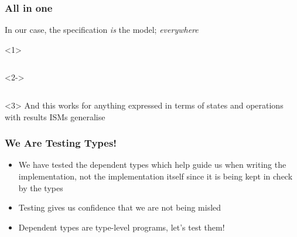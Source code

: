 \documentclass[compress]{beamer}
\begin{document}
\begin{frame}[fragile]
  \frametitle{All in one}

  \large

  
  In our case, the specification \textit{is} the model; \textit{everywhere}

  \begin{onlyenv}<1>
  \inputminted{Idris}{qc-things/ATM-arb-trace.idr}
  \end{onlyenv}

  \begin{onlyenv}<2->
  \inputminted[highlightlines=4-5,highlightcolor=highl]{Idris}{qc-things/ATM-arb-trace.idr}
  \end{onlyenv}

  \begin{onlyenv}<3>
  And this works for anything expressed in terms of states and operations with
  results {\textemdash} ISMs generalise
  \end{onlyenv}

\end{frame}


\begin{frame}
  \frametitle{We Are Testing Types!}

  \large

  \begin{itemize}
    \item<1-> We have tested the dependent types which help guide us when
              writing the implementation, not the implementation itself since it
              is being kept in check by the types
    \item<2-> Testing gives us confidence that we are not being misled
    \item<3-> Dependent types are type-level programs, let's test them!
  \end{itemize}

\end{frame}
\end{document}
